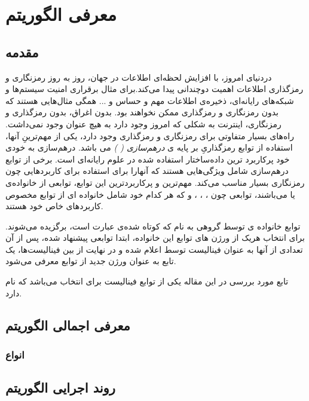 \chapter{معرفی الگوریتم
}
\section{
مقدمه
}
دردنیای امروز، با افزایش لحظه‌ای اطلاعات در جهان، روز‌ به ‌روز رمزنگاری و رمزگذاری اطلاعات اهمیت دوچندانی پیدا می‌کند.برای مثال برقراری امنیت سیستم‌ها و شبکه‌های رایانه‌ای، ذخیره‌ی اطلاعات مهم و حساس و ... همگی مثال‌هایی هستند که بدون رمزنگاری و رمزگذاری ممکن نخواهند بود. بدون اغراق، بدون رمزگذاری و رمزنگاری، اینترنت به شکلی که امروز وجود دارد به هیچ عنوان وجود نمی‌داشت.
راه‌های بسیار متفاوتی برای رمزنگاری و رمزگذاری وجود دارد، یکی از مهم‌ترینِ آنها، استفاده از توابع رمزگذاریِ بر پایه ی
\textit{ 
	درهم‌سازی (
)
}
می باشد. درهم‌سازی به خودی خود پرکاربرد ترین داده‌ساختار استفاده شده در علوم رایانه‌ای است. برخی از توابع درهم‌سازی شامل ویژگی‌هایی هستند که آنهارا برای استفاده برای کاربرد‌هایی چون رمزنگاری بسیار مناسب می‌کند. مهم‌ترین و پرکاربردترین این توابع، توابعی از خانواده‌ی 
\textit{}
یا 
\textit{}
می‌باشند، توابعی چون 
،
،
،
و 
که هر کدام خود شامل خانواده ای از توابع مخصوص کاربرد‌های خاص خود هستند.

توابع خانواده ی 
توسط گروهی به نام 
\textit{}
که کوتاه شده‌ی عبارت
\textit{}
است، برگزیده می‌شوند. برای انتخاب هریک از ورژن های توابع این خانواده، ابتدا توابعی پیشنهاد شده، پس از آن تعدادی از آنها به عنوان فینالیست توسط 
اعلام شده و در نهایت از بین فینالیست‌ها، یک تابع به عنوان ورژن جدید از توابع 
معرفی می‌شود.

	تابع مورد بررسی در این مقاله یکی از توابع فینالیست برای انتخاب 
	می‌باشد که 
	نام دارد. 
	
\section{
معرفی اجمالی الگوریتم
}
\subsection{
انواع
}
\section{
روند اجرایی الگوریتم
}



	